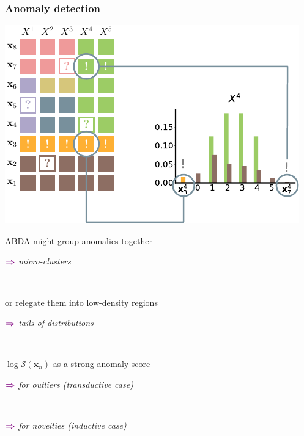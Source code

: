 \documentclass[xcolor={usenames,dvipsnames,svgnames}, compress, aspectratio=169, 11pt]{beamer}
\newcommand{\SPN}{\mathcal{S}}
\newcommand{\x}{\mathbf{x}}
\newcommand{\comment}[3][\small]{\begin{minipage}{1\linewidth}
          \raggedleft
          {
            $\color{violet}\boldsymbol\Rightarrow$
            #1
            {\emph{#2}}
          }
      \end{minipage}#3\\
}
\begin{document}
\begin{frame}[t, htt=bgrey2]
  \frametitle{Anomaly detection}

  \large
  \begin{minipage}[t]{0.5\linewidth}
    \vspace{6pt}
    \includegraphics[width=1.05\linewidth]{figures/abda-anomaly}
  \end{minipage}\hfill\begin{minipage}[t]{0.45\linewidth}
    \raggedright
    \vspace{10pt}

    ABDA might group anomalies together\\
    \comment[\small]{micro-clusters}{}
    \vspace{10pt}

    or relegate them into low-density regions\\
    \comment[\small]{tails of distributions}{}
    \vspace{10pt}
    
    $\log \SPN(\x_{n})$ as a strong anomaly score\\
    \comment[\small]{for outliers (transductive case)}{}
    \comment[\small]{for novelties (inductive case)}{}
    
     
    
  \end{minipage}  
\end{frame}
\end{document}
